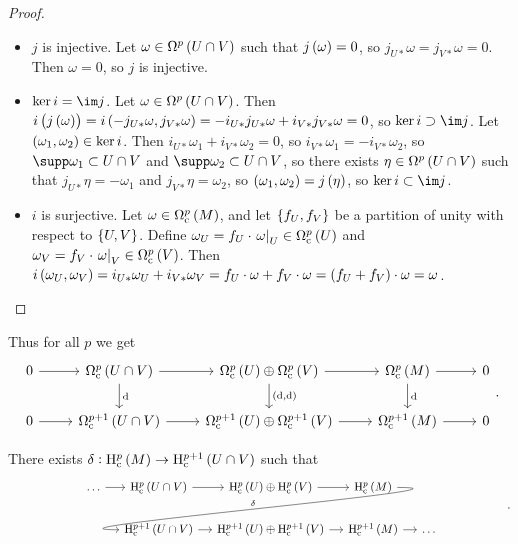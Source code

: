 \begin{proof}
\hfill
\begin{itemize}
\item $ j $ is injective. Let $ \omega \in \Omega^p\br{U \cap V} $ such that $ j\br{\omega} = 0 $, so $ j_{U*}\omega = j_{V*}\omega = 0 $. Then $ \omega = 0 $, so $ j $ is injective.
\item $ \ker i = \im j $. Let $ \omega \in \Omega^p\br{U \cap V} $. Then $ i\br{j\br{\omega}} = i\br{-j_{U*}\omega, j_{V*}\omega} = -i_{U*}j_{U*}\omega + i_{V*}j_{V*}\omega = 0 $, so $ \ker i \supset \im j $. Let $ \br{\omega_1, \omega_2} \in \ker i $. Then $ i_{U*}\omega_1 + i_{V*}\omega_2 = 0 $, so $ i_{V*}\omega_1 = -i_{V*}\omega_2 $, so $ \supp \omega_1 \subset U \cap V $ and $ \supp \omega_2 \subset U \cap V $, so there exists $ \eta \in \Omega^p\br{U \cap V} $ such that $ j_{U*}\eta = -\omega_1 $ and $ j_{V*}\eta = \omega_2 $, so $ \br{\omega_1, \omega_2} = j\br{\eta} $, so $ \ker i \subset \im j $.
\item $ i $ is surjective. Let $ \omega \in \Omega_\c^p\br{M} $, and let $ \cbr{f_U, f_V} $ be a partition of unity with respect to $ \cbr{U, V} $. Define $ \omega_U = f_U \cdot \eval{\omega}_U \in \Omega_\c^p\br{U} $ and $ \omega_V = f_V \cdot \eval{\omega}_V \in \Omega_\c^p\br{V} $. Then $ i\br{\omega_U, \omega_V} = i_{U*}\omega_U + i_{V*}\omega_V = f_U \cdot \omega + f_V \cdot \omega = \br{f_U + f_V} \cdot \omega = \omega $.
\end{itemize}
\end{proof}

Thus for all $ p $ we get
$$
\begin{tikzcd}
0 \arrow{r} & \Omega_\c^p\br{U \cap V} \arrow{r} \arrow{d}{\d} & \Omega_\c^p\br{U} \oplus \Omega_\c^p\br{V} \arrow{r} \arrow{d}{\br{\d, \d}} & \Omega_\c^p\br{M} \arrow{r} \arrow{d}{\d} & 0 \\
0 \arrow{r} & \Omega_\c^{p + 1}\br{U \cap V} \arrow{r} & \Omega_\c^{p + 1}\br{U} \oplus \Omega_\c^{p + 1}\br{V} \arrow{r} & \Omega_\c^{p + 1}\br{M} \arrow{r} & 0
\end{tikzcd}.
$$

\begin{theorem}
There exists $ \delta : \H_\c^p\br{M} \to \H_\c^{p + 1}\br{U \cap V} $ such that
$$
\begin{tikzcd}[column sep=small]
\dots \arrow{r} & \H_\c^p\br{U \cap V} \arrow{r} & \H_\c^p\br{U} \oplus \H_\c^p\br{V} \arrow{r} & \H_\c^p\br{M} \arrow[in=180, out=0]{dll}[swap]{\delta} & \\
& \H_\c^{p + 1}\br{U \cap V} \arrow{r} & \H_\c^{p + 1}\br{U} \oplus \H_\c^{p + 1}\br{V} \arrow{r} & \H_\c^{p + 1}\br{M} \arrow{r} & \dots
\end{tikzcd}.
$$
\end{theorem}

